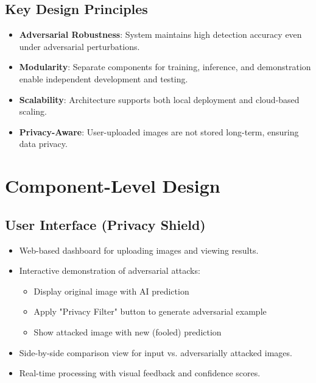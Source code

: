 \documentclass[a4paper,12pt]{article}
\begin{document}
\subsection{Key Design Principles}
\begin{itemize}
    \item \textbf{Adversarial Robustness}: System maintains high detection accuracy even under adversarial perturbations.
    \item \textbf{Modularity}: Separate components for training, inference, and demonstration enable independent development and testing.
    \item \textbf{Scalability}: Architecture supports both local deployment and cloud-based scaling.
    \item \textbf{Privacy-Aware}: User-uploaded images are not stored long-term, ensuring data privacy.
\end{itemize}

\section{Component-Level Design}

\subsection{User Interface (Privacy Shield)}
\begin{itemize}
    \item Web-based dashboard for uploading images and viewing results.
    \item Interactive demonstration of adversarial attacks:
    \begin{itemize}
        \item Display original image with AI prediction
        \item Apply "Privacy Filter" button to generate adversarial example
        \item Show attacked image with new (fooled) prediction
    \end{itemize}
    \item Side-by-side comparison view for input vs. adversarially attacked images.
    \item Real-time processing with visual feedback and confidence scores.
\end{itemize}
\end{document}
